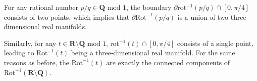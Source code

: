 \documentclass[11pt]{article}
\begin{document}
For any rational number $p/q\in\mathbf{Q}\text{ mod }1$, the boundary $\partial\text{rot}^{-1}\left(p/q\right)\cap\left[0,\pi/4\right]$ consists of two points, which implies that $\partial\text{Rot}^{-1}\left(p/q\right)$ is a union of two three-dimensional real manifolds.
    
Similarly, for any $t\in\mathbf{R}\setminus\mathbf{Q}\text{ mod }1$, $\text{rot}^{-1}\left(t\right)\cap\left[0,\pi/4\right]$ consists of a single point, leading to $\text{Rot}^{-1}\left(t\right)$ being a three-dimensional real manifold. For the same reasons as before, the $\text{Rot}^{-1}\left(t\right)$ are exactly the connected components of $\text{Rot}^{-1}\left(\mathbf{R\setminus\mathbf{Q}}\right)$.

\newpage


\end{document}
